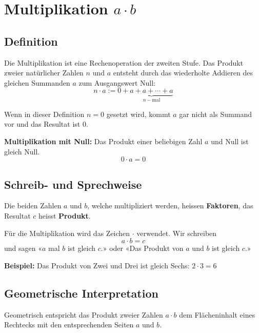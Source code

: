 \newpage
\section{Multiplikation $a\cdot b$}

\subsection{Definition}
Die Multiplikation ist eine Rechenoperation der zweiten Stufe. Das Produkt zweier natürlicher Zahlen $n$ und $a$ entsteht durch das wiederholte Addieren des gleichen Summanden $a$ zum Ausgangswert Null:
\[
  n\cdot a := 0+\underbrace{a+a+\cdots+a}_{n-\text{mal}}
\]

Wenn in dieser Definition $n=0$ gesetzt wird, kommt $a$ gar nicht als Summand vor und das Resultat ist $0$.
\begin{theorem}
  \textbf{Multiplikation mit Null:} Das Produkt einer beliebigen Zahl $a$ und Null ist gleich Null.
  \[
    0 \cdot a = 0
  \]
\end{theorem}

\subsection{Schreib- und Sprechweise}
Die beiden Zahlen $a$ und $b$, welche multipliziert werden, heissen \textbf{Faktoren}, das Resultat $c$ heisst \textbf{Produkt}.

Für die Multiplikation wird das Zeichen $\cdot$ verwendet. Wir schreiben
\[
  a \cdot b = c
\]
und sagen «$a$ mal $b$ ist gleich $c$.» oder «Das Produkt von $a$ und $b$ ist gleich $c$.»

\begin{example}
\textbf{Beispiel:} Das Produkt von Zwei und Drei ist gleich Sechs: $2 \cdot 3 = 6$
\end{example}

\subsection{Geometrische Interpretation}

Geometrisch entspricht das Produkt zweier Zahlen $a\cdot b$ dem Flächeninhalt eines Rechtecks mit den entsprechenden Seiten $a$ und $b$.

